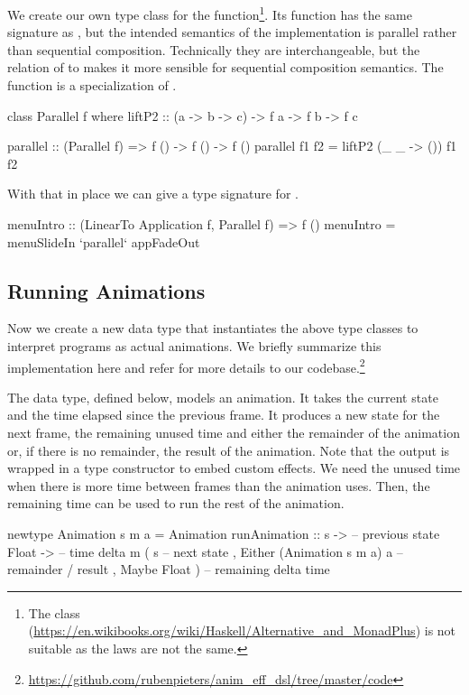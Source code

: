 We create our own  type class for the  function\footnote{The  class (\url{https://en.wikibooks.org/wiki/Haskell/Alternative_and_MonadPlus}) is not suitable as the laws are not the same.}. Its  function has the same signature as , but the intended semantics of the  implementation is parallel rather than sequential composition. Technically they are interchangeable, but the relation of  to  makes it more sensible for sequential composition semantics. The  function is a specialization of .

\begin{code}
class Parallel f where
  liftP2 :: (a -> b -> c) -> f a -> f b -> f c

parallel :: (Parallel f) => f () -> f () -> f ()
parallel f1 f2 = liftP2 (\_ _ -> ()) f1 f2
\end{code}
With that in place we can give a type signature for .
\begin{code}
menuIntro :: (LinearTo Application f, Parallel f) => f ()
menuIntro = menuSlideIn `parallel` appFadeOut
\end{code}

\subsection{Running Animations}

Now we create a new  data type that instantiates the above
type classes to interpret \dsl{} programs as actual animations. We briefly
summarize this implementation here and refer for more details to
our codebase.\footnote{\url{https://github.com/rubenpieters/anim_eff_dsl/tree/master/code}}

The  data type, defined below, models an animation.
It takes the current state  and the
time elapsed since the previous frame. It produces a new
state for the next frame, the remaining unused time and either the remainder of the animation or, if there is no remainder, the result of the animation. Note that the output is wrapped in a type
constructor  to embed custom effects. 
We need the unused time when there is more time between frames than the animation
uses.
Then, the remaining time
can be used to run the rest of the animation.

\begin{code}
newtype Animation s m a = Animation { runAnimation ::
    s ->                             -- previous state
    Float ->                         -- time delta
    m ( s                            -- next state
      , Either (Animation s m a) a   -- remainder / result
      , Maybe Float )}               -- remaining delta time
\end{code}

